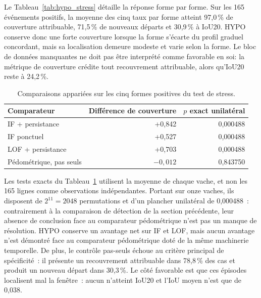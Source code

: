 Le Tableau~\ref{tab:hypo_stress} détaille la réponse forme par forme.
Sur les 165 événements positifs, la moyenne des cinq taux par forme atteint 97,0\,\% de
couverture attribuable, 71,5\,\% de nouveaux départs et 30,9\,\% à IoU20. HYPO conserve
donc une forte couverture lorsque la forme s'écarte du profil graduel concordant, mais sa
localisation demeure modeste et varie selon la forme. Le bloc de données manquantes ne doit
pas être interprété comme favorable en soi: la métrique de couverture crédite tout
recouvrement attribuable, alors qu'IoU20 reste à 24,2\,\%.

\begin{table}[H]
  \centering
  \caption{Comparaisons appariées sur les cinq formes positives du test de stress.}
  \label{tab:hypo_stress_comparisons}
  \small
  \begin{tabular}{lrr}
    \toprule
    Comparateur & Différence de couverture & $p$ exact unilatéral \\
    \midrule
    IF + persistance & +0,842 & 0,000488 \\
    IF ponctuel & +0,527 & 0,000488 \\
    LOF + persistance & +0,703 & 0,000488 \\
    Pédométrique, pas seuls & $-0,012$ & 0,843750 \\
    \bottomrule
  \end{tabular}
\end{table}

Les tests exacts du Tableau~\ref{tab:hypo_stress_comparisons} utilisent la moyenne de chaque
vache, et non les 165 lignes comme
observations indépendantes. Portant sur onze vaches, ils disposent de $2^{11}=2048$
permutations et d'un plancher unilatéral de 0,000488~: contrairement à la comparaison de détection de la
section précédente, leur absence de conclusion face au comparateur pédométrique n'est pas un
manque de résolution. HYPO conserve un avantage net sur IF et LOF, mais aucun avantage
n'est démontré face au comparateur pédométrique doté de la même machinerie temporelle. De
plus, le contrôle pas-seuls échoue au critère principal de spécificité~: il présente un
recouvrement attribuable dans 78,8\,\% des cas et produit un nouveau départ dans 30,3\,\%.
Le côté favorable est que ces épisodes localisent mal la fenêtre~: aucun n'atteint IoU20 et
l'IoU moyen n'est que de 0,038.

